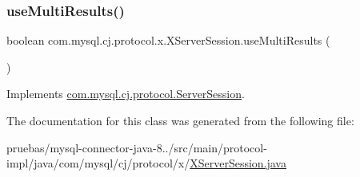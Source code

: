 \subsubsection{\texorpdfstring{use\+Multi\+Results()}{useMultiResults()}}
{\footnotesize\ttfamily boolean com.\+mysql.\+cj.\+protocol.\+x.\+X\+Server\+Session.\+use\+Multi\+Results (\begin{DoxyParamCaption}{ }\end{DoxyParamCaption})}



Implements \mbox{\hyperlink{interfacecom_1_1mysql_1_1cj_1_1protocol_1_1_server_session_a7d92f74e5fe2cd93115d904f136b090b}{com.\+mysql.\+cj.\+protocol.\+Server\+Session}}.



The documentation for this class was generated from the following file\+:\begin{DoxyCompactItemize}
\item 
pruebas/mysql-\/connector-\/java-\/8../src/main/protocol-\/impl/java/com/mysql/cj/protocol/x/\mbox{\hyperlink{_x_server_session_8java}{X\+Server\+Session.\+java}}\end{DoxyCompactItemize}
